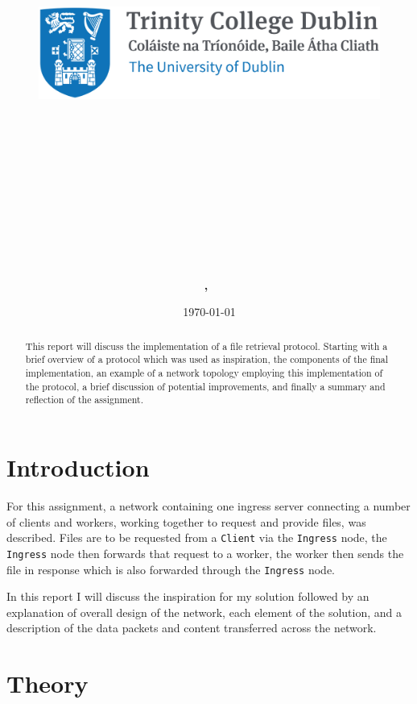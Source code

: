 \documentclass{article}
\title{
\vspace{-1in}
\begin{figure}[!ht]
\flushleft
\includegraphics[width=0.4\linewidth]{reduced-trinity.png}
\end{figure}
\vspace{-0.5cm}
\hrulefill \\
\vspace{0.5cm}
\textmd{\textbf{\moduleCode\ \moduleName}}\\
\textmd{\textbf{\assignmentTitle}}\\
\vspace{0.5cm}
\hrulefill \\
}
\author{\textbf{\authorName,\ \authorID}}
\date{\today}
\newcommand{\code}[1]{\texttt{#1}}
\begin{document}
\captionsetup{width=.8\linewidth} 

\maketitle
\tableofcontents
\vspace{0.5in}

\begin{abstract}
	This report will discuss the implementation of a file retrieval protocol. Starting with a brief overview of a protocol which was used as inspiration, the components of the final implementation, an example of a network topology employing this implementation of the protocol, a brief discussion of potential improvements, and finally a summary and reflection of the assignment.
\end{abstract}

\newpage
\section{Introduction}


For this assignment, a network containing one ingress server connecting a number of clients and workers, working together to request and provide files, was described. Files are to be requested from a \code{Client} via the \code{Ingress} node, the \code{Ingress} node then forwards that request to a worker, the worker then sends the file in response which is also forwarded through the \code{Ingress} node.

In this report I will discuss the inspiration for my solution followed by an explanation of overall design of the network, each element of the solution, and a description of the data packets and content transferred across the network.

\section{Theory}


\end{document}
